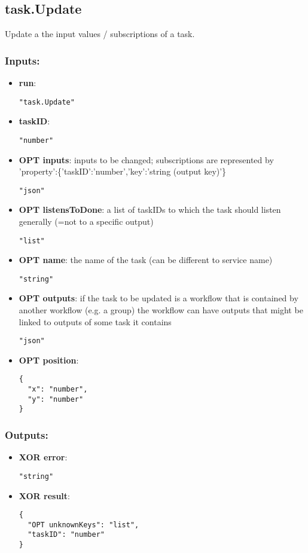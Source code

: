 \subsection{task.Update}
Update a the input values / subscriptions of a task.
\subsubsection*{Inputs:}
\begin{itemize}
    \item \textbf{run}: 
\begin{lstlisting}
"task.Update"
\end{lstlisting}
    \item \textbf{taskID}: 
\begin{lstlisting}
"number"
\end{lstlisting}
    \item \textbf{OPT inputs}: inputs to be changed; subscriptions are represented by 'property':\{'taskID':'number','key':'string (output key)'\}
\begin{lstlisting}
"json"
\end{lstlisting}
    \item \textbf{OPT listensToDone}: a list of taskIDs to which the task should listen generally (=not to a specific output)
\begin{lstlisting}
"list"
\end{lstlisting}
    \item \textbf{OPT name}: the name of the task (can be different to service name)
\begin{lstlisting}
"string"
\end{lstlisting}
    \item \textbf{OPT outputs}: if the task to be updated is a workflow that is contained by another  workflow (e.g. a group) the workflow can have outputs that might be  linked to outputs of some task it contains
\begin{lstlisting}
"json"
\end{lstlisting}
    \item \textbf{OPT position}: 
\begin{lstlisting}
{
  "x": "number", 
  "y": "number"
}
\end{lstlisting}
  \end{itemize}

\subsubsection*{Outputs:}
\begin{itemize}
    \item \textbf{XOR error}: 
\begin{lstlisting}
"string"
\end{lstlisting}
    \item \textbf{XOR result}: 
\begin{lstlisting}
{
  "OPT unknownKeys": "list", 
  "taskID": "number"
}
\end{lstlisting}
  \end{itemize}

